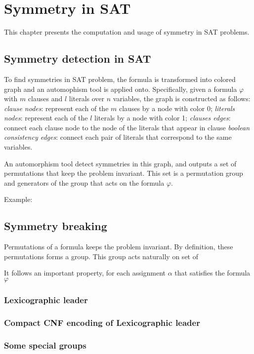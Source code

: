 \chapter{Symmetry in SAT}\label{chap:symmetryinsat}

This chapter presents the computation and usage of symmetry in SAT problems.

\section{Symmetry detection in SAT}

To find symmetries in SAT problem, the formula is transformed into colored graph
and an automophism tool is applied onto. Specifically, given a formula $\varphi$ with
$m$ clauses and $l$ literals over $n$ variables, the graph is constructed as follows:
\emph{clause nodes}: represent each of the $m$ clauses by a node with color 0;
\emph{literals nodes}: represent each of the $l$ literals by a node with color 1;
\emph{clauses edges}: connect each clause node to the node of the literals that appear in clause
\emph{boolean consistency edges}: connect each pair of literals that correspond to the same variables.

An automorphism tool detect symmetries in this graph, and outputs a set of permutations that keep the problem
invariant. This set is a permutation group and generators of the group that acts on the formula $\varphi$.

Example:

\section{Symmetry breaking}

Permutations of a formula keeps the problem invariant. By definition, these permutations forms a group.
This group acts naturally on set of 


It follows an important property, for each assignment $\alpha$ that satisfies the formula $\varphi$ 

\subsection{Lexicographic leader}
\subsection{Compact CNF encoding of Lexicographic leader}

\subsection{Some special groups}




